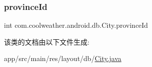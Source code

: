\subsubsection{\texorpdfstring{provinceId}{provinceId}}
{\footnotesize\ttfamily int com.\+coolweather.\+android.\+db.\+City.\+province\+Id\hspace{0.3cm}{\ttfamily [private]}}



该类的文档由以下文件生成\+:\begin{DoxyCompactItemize}
\item 
app/src/main/res/layout/db/\mbox{\hyperlink{res_2layout_2db_2_city_8java}{City.\+java}}\end{DoxyCompactItemize}
